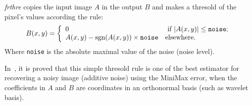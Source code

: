 {\em frthre} copies the input image $A$ in the output $B$ and makes a thresold 
of the pixel's values according the rule:
\[
B(x,y) = \left\{
\begin{array}{ll}
 0 & \mbox{ if } |A(x,y)| \leq \mbox{\tt noise}; \\
 A(x,y) - \mbox{sgn}(A(x,y)) \times \mbox{\tt noise} & \mbox{elsewhere.} 
\end{array}
\right.
\]
Where \verb+noise+ is the absolute maximal value of the noise (noise level).

In~\cite{donoho.johnstone:ideal}, it is proved that this simple thresold rule is one 
of the best estimator for recovering a noisy image (additive noise) using the MiniMax 
error, when the coefficients in $A$ and $B$ are coordinates in an orthonormal basis
(such as wavelet basis).

